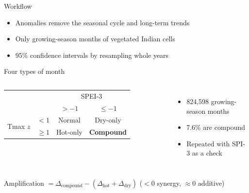 \documentclass[11pt,aspectratio=169]{beamer}
\begin{document}
\begin{frame}{Workflow}
  \centering

  \vspace{12pt}
  \begin{itemize}
    \item Anomalies remove the seasonal cycle and long-term trends
    \item Only growing-season months of vegetated Indian cells
    \item 95\% confidence intervals by resampling whole years
  \end{itemize}
\end{frame}

\begin{frame}{Four types of month}
  \begin{columns}
    \centering
    \renewcommand{\arraystretch}{1.4}
    \begin{tabular}{cc|c|c}
      & & \multicolumn{2}{c}{SPEI-3} \\
      & & $> -1$ & $\le -1$ \\
      \hline
      \multirow{2}{*}{Tmax $z$} & $< 1$ & Normal & Dry-only \\
      & $\ge 1$ & Hot-only & \textbf{Compound} \\
    \end{tabular}
    \begin{itemize}
      \item 824,598 growing-season months
      \item 7.6\% are compound
      \item Repeated with SPI-3 as a check
    \end{itemize}
  \end{columns}

  \vspace{10pt}
  \centering
  \small Amplification $= \Delta_{\text{compound}} - (\Delta_{\text{hot}} +
  \Delta_{\text{dry}})$ \quad ($<0$ synergy, $\approx 0$ additive)
\end{frame}
\end{document}
